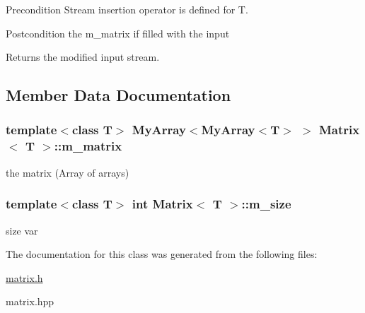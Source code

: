 \begin{DoxyPrecond}{Precondition}
Stream insertion operator is defined for {\ttfamily T}. 
\end{DoxyPrecond}
\begin{DoxyPostcond}{Postcondition}
the m\+\_\+matrix if filled with the input 
\end{DoxyPostcond}
\begin{DoxyReturn}{Returns}
the modified input stream. 
\end{DoxyReturn}


\subsection{Member Data Documentation}
\subsubsection[{\texorpdfstring{m\+\_\+matrix}{m_matrix}}]{\setlength{\rightskip}{0pt plus 5cm}template$<$class T$>$ {\bf My\+Array}$<${\bf My\+Array}$<$T$>$ $>$ {\bf Matrix}$<$ T $>$\+::m\+\_\+matrix\hspace{0.3cm}{\ttfamily [protected]}}\hypertarget{classMatrix_a3190abe45497430b3aa006002af3cb37}{}\label{classMatrix_a3190abe45497430b3aa006002af3cb37}
the matrix (Array of array\textquotesingle{}s) 
\subsubsection[{\texorpdfstring{m\+\_\+size}{m_size}}]{\setlength{\rightskip}{0pt plus 5cm}template$<$class T$>$ int {\bf Matrix}$<$ T $>$\+::m\+\_\+size\hspace{0.3cm}{\ttfamily [protected]}}\hypertarget{classMatrix_a1113fd527e7677a93e88d1e736450968}{}\label{classMatrix_a1113fd527e7677a93e88d1e736450968}
size var 

The documentation for this class was generated from the following files\+:\begin{DoxyCompactItemize}
\item 
\hyperlink{matrix_8h}{matrix.\+h}\item 
matrix.\+hpp\end{DoxyCompactItemize}
